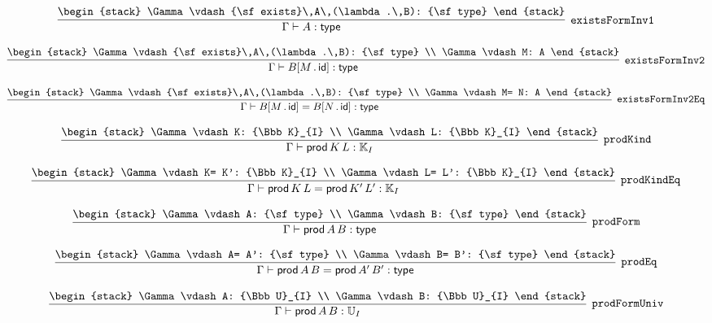 \[
\infer[{\tt existsFormInv1}]{\Gamma \vdash A: {\sf type}}{
\begin{stack}
\Gamma \vdash {\sf exists}\,A\,(\lambda .\,B): {\sf type}
\end{stack}}
\]

\[
\infer[{\tt existsFormInv2}]{\Gamma \vdash B[M\,.\,{\sf id}]: {\sf type}}{
\begin{stack}
\Gamma \vdash {\sf exists}\,A\,(\lambda .\,B): {\sf type}
\\
\Gamma \vdash M: A
\end{stack}}
\]

\[
\infer[{\tt existsFormInv2Eq}]{\Gamma \vdash B[M\,.\,{\sf id}]= B[N\,.\,{\sf id}]: {\sf type}}{
\begin{stack}
\Gamma \vdash {\sf exists}\,A\,(\lambda .\,B): {\sf type}
\\
\Gamma \vdash M= N: A
\end{stack}}
\]

\[
\infer[{\tt prodKind}]{\Gamma \vdash {\sf prod}\,K\,L: {\Bbb K}_{I}}{
\begin{stack}
\Gamma \vdash K: {\Bbb K}_{I}
\\
\Gamma \vdash L: {\Bbb K}_{I}
\end{stack}}
\]

\[
\infer[{\tt prodKindEq}]{\Gamma \vdash {\sf prod}\,K\,L= {\sf prod}\,K'\,L': {\Bbb K}_{I}}{
\begin{stack}
\Gamma \vdash K= K': {\Bbb K}_{I}
\\
\Gamma \vdash L= L': {\Bbb K}_{I}
\end{stack}}
\]

\[
\infer[{\tt prodForm}]{\Gamma \vdash {\sf prod}\,A\,B: {\sf type}}{
\begin{stack}
\Gamma \vdash A: {\sf type}
\\
\Gamma \vdash B: {\sf type}
\end{stack}}
\]

\[
\infer[{\tt prodEq}]{\Gamma \vdash {\sf prod}\,A\,B= {\sf prod}\,A'\,B': {\sf type}}{
\begin{stack}
\Gamma \vdash A= A': {\sf type}
\\
\Gamma \vdash B= B': {\sf type}
\end{stack}}
\]

\[
\infer[{\tt prodFormUniv}]{\Gamma \vdash {\sf prod}\,A\,B: {\Bbb U}_{I}}{
\begin{stack}
\Gamma \vdash A: {\Bbb U}_{I}
\\
\Gamma \vdash B: {\Bbb U}_{I}
\end{stack}}
\]

